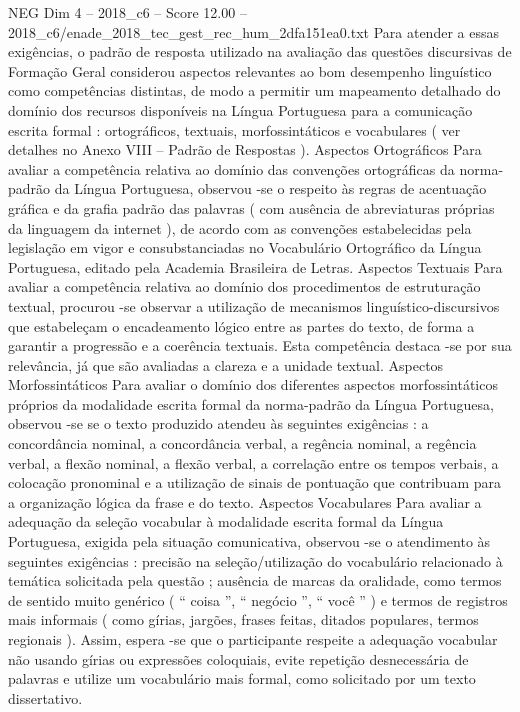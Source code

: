 \begin{textsample}{NEG Dim 4 – 2018\_c6 – Score 12.00 – 2018\_c6/enade\_2018\_tec\_gest\_rec\_hum\_2dfa151ea0.txt}
Para atender a essas exigências, o padrão de resposta utilizado na avaliação das questões discursivas de Formação Geral considerou aspectos relevantes ao bom desempenho linguístico como competências distintas, de modo a permitir um mapeamento detalhado do domínio dos recursos disponíveis na Língua Portuguesa para a comunicação escrita formal : ortográficos, textuais, morfossintáticos e vocabulares ( ver detalhes no Anexo VIII – Padrão de Respostas ).
Aspectos Ortográficos Para avaliar a competência relativa ao domínio das convenções ortográficas da norma-padrão da Língua Portuguesa, observou -se o respeito às regras de acentuação gráfica e da grafia padrão das palavras ( com ausência de abreviaturas próprias da linguagem da internet ), de acordo com as convenções estabelecidas pela legislação em vigor e consubstanciadas no Vocabulário Ortográfico da Língua Portuguesa, editado pela Academia Brasileira de Letras.
Aspectos Textuais Para avaliar a competência relativa ao domínio dos procedimentos de estruturação textual, procurou -se observar a utilização de mecanismos linguístico-discursivos que estabeleçam o encadeamento lógico entre as partes do texto, de forma a garantir a progressão e a coerência textuais.
Esta competência destaca -se por sua relevância, já que são avaliadas a clareza e a unidade textual.
Aspectos Morfossintáticos Para avaliar o domínio dos diferentes aspectos morfossintáticos próprios da modalidade escrita formal da norma-padrão da Língua Portuguesa, observou -se se o texto produzido atendeu às seguintes exigências : a concordância nominal, a concordância verbal, a regência nominal, a regência verbal, a flexão nominal, a flexão verbal, a correlação entre os tempos verbais, a colocação pronominal e a utilização de sinais de pontuação que contribuam para a organização lógica da frase e do texto.
Aspectos Vocabulares Para avaliar a adequação da seleção vocabular à modalidade escrita formal da Língua Portuguesa, exigida pela situação comunicativa, observou -se o atendimento às seguintes exigências : precisão na seleção/utilização do vocabulário relacionado à temática solicitada pela questão ; ausência de marcas da oralidade, como termos de sentido muito genérico ( “ coisa ”, “ negócio ”, “ você ” ) e termos de registros mais informais ( como gírias, jargões, frases feitas, ditados populares, termos regionais ).
Assim, espera -se que o participante respeite a adequação vocabular não usando gírias ou expressões coloquiais, evite repetição desnecessária de palavras e utilize um vocabulário mais formal, como solicitado por um texto dissertativo.

\end{textsample}
